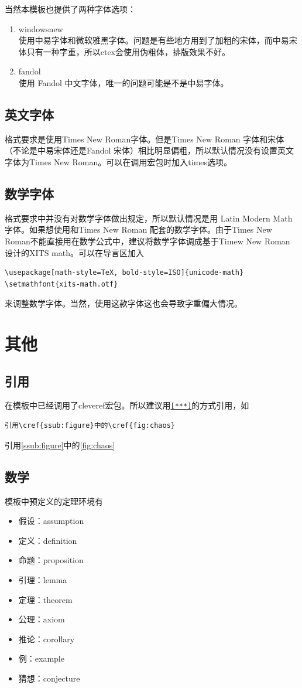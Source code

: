 \documentclass{LZU}
\newcommand{\package}[1]{{\sffamily #1}}
\begin{document}
当然本模板也提供了两种字体选项：
\begin{enumerate}
    \item windowsnew\\
        使用中易字体和微软雅黑字体。问题是有些地方用到了加粗的宋体，而中易宋体只有一种字重，所以\package{ctex}会使用伪粗体，排版效果不好。
    \item fandol\\
        使用 Fandol 中文字体，唯一的问题可能是不是中易字体。
\end{enumerate}
\subsection{英文字体}
格式要求是使用Times New Roman字体。但是Times New Roman 字体和宋体（不论是中易宋体还是Fandol 宋体）相比明显偏粗，所以默认情况没有设置英文字体为Times New Roman。可以在调用宏包时加入times选项。
\subsection{数学字体}
格式要求中并没有对数学字体做出规定，所以默认情况是用 Latin Modern Math 字体。如果想使用和Times New Roman 配套的数学字体。由于Times New Roman不能直接用在数学公式中，建议将数学字体调成基于Timew New Roman 设计的XITS math。可以在导言区加入
\begin{verbatim}
\usepackage[math-style=TeX, bold-style=ISO]{unicode-math}
\setmathfont{xits-math.otf}
\end{verbatim}
来调整数学字体。当然，使用这款字体这也会导致字重偏大情况。

\section{其他}
\subsection{引用}
在模板中已经调用了\package{cleveref}宏包。所以建议用\texttt{\cref{***}}的方式引用，如
\begin{verbatim}
引用\cref{ssub:figure}中的\cref{fig:chaos}
\end{verbatim}
引用\cref{ssub:figure}中的\cref{fig:chaos}
\subsection{数学}
模板中预定义的定理环境有
\begin{itemize}
    \item 假设：assumption
    \item 定义：definition
    \item 命题：proposition
    \item 引理：lemma
    \item 定理：theorem
    \item 公理：axiom
    \item 推论：corollary
    \item 例：example
    \item 猜想：conjecture
\end{itemize}
\end{document}
